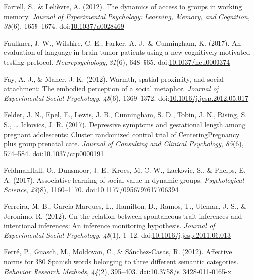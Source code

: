 \documentclass[english,man]{apa6}
\theoremstyle{definition}
\theoremstyle{definition}
\theoremstyle{definition}
\theoremstyle{remark}
\begin{document}
\hypertarget{ref-Farrell2012}{}
Farrell, S., \& Lelièvre, A. (2012). The dynamics of access to groups in
working memory. \emph{Journal of Experimental Psychology: Learning,
Memory, and Cognition}, \emph{38}(6), 1659--1674.
doi:\href{https://doi.org/10.1037/a0028469}{10.1037/a0028469}

\hypertarget{ref-Faulkner2017}{}
Faulkner, J. W., Wilshire, C. E., Parker, A. J., \& Cunningham, K.
(2017). An evaluation of language in brain tumor patients using a new
cognitively motivated testing protocol. \emph{Neuropsychology},
\emph{31}(6), 648--665.
doi:\href{https://doi.org/10.1037/neu0000374}{10.1037/neu0000374}

\hypertarget{ref-Fay2012}{}
Fay, A. J., \& Maner, J. K. (2012). Warmth, spatial proximity, and
social attachment: The embodied perception of a social metaphor.
\emph{Journal of Experimental Social Psychology}, \emph{48}(6),
1369--1372.
doi:\href{https://doi.org/10.1016/j.jesp.2012.05.017}{10.1016/j.jesp.2012.05.017}

\hypertarget{ref-Felder2017a}{}
Felder, J. N., Epel, E., Lewis, J. B., Cunningham, S. D., Tobin, J. N.,
Rising, S. S., \ldots{} Ickovics, J. R. (2017). Depressive symptoms and
gestational length among pregnant adolescents: Cluster randomized
control trial of CenteringPregnancy plus group prenatal care.
\emph{Journal of Consulting and Clinical Psychology}, \emph{85}(6),
574--584.
doi:\href{https://doi.org/10.1037/ccp0000191}{10.1037/ccp0000191}

\hypertarget{ref-FeldmanHall2017}{}
FeldmanHall, O., Dunsmoor, J. E., Kroes, M. C. W., Lackovic, S., \&
Phelps, E. A. (2017). Associative learning of social value in dynamic
groups. \emph{Psychological Science}, \emph{28}(8), 1160--1170.
doi:\href{https://doi.org/10.1177/0956797617706394}{10.1177/0956797617706394}

\hypertarget{ref-Ferreira2012}{}
Ferreira, M. B., Garcia-Marques, L., Hamilton, D., Ramos, T., Uleman, J.
S., \& Jeronimo, R. (2012). On the relation between spontaneous trait
inferences and intentional inferences: An inference monitoring
hypothesis. \emph{Journal of Experimental Social Psychology},
\emph{48}(1), 1--12.
doi:\href{https://doi.org/10.1016/j.jesp.2011.06.013}{10.1016/j.jesp.2011.06.013}

\hypertarget{ref-Ferre2012}{}
Ferré, P., Guasch, M., Moldovan, C., \& Sánchez-Casas, R. (2012).
Affective norms for 380 Spanish words belonging to three different
semantic categories. \emph{Behavior Research Methods}, \emph{44}(2),
395--403.
doi:\href{https://doi.org/10.3758/s13428-011-0165-x}{10.3758/s13428-011-0165-x}
\end{document}

